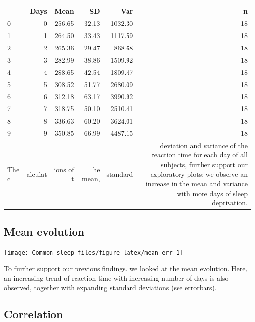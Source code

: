 \documentclass[
]{article}
\begin{document}
\begin{longtable}[]{@{}lrrrrr@{}}
\toprule
& Days & Mean & SD & Var & n\tabularnewline
\midrule
\endhead
0 & 0 & 256.65 & 32.13 & 1032.30 & 18\tabularnewline
1 & 1 & 264.50 & 33.43 & 1117.59 & 18\tabularnewline
2 & 2 & 265.36 & 29.47 & 868.68 & 18\tabularnewline
3 & 3 & 282.99 & 38.86 & 1509.92 & 18\tabularnewline
4 & 4 & 288.65 & 42.54 & 1809.47 & 18\tabularnewline
5 & 5 & 308.52 & 51.77 & 2680.09 & 18\tabularnewline
6 & 6 & 312.18 & 63.17 & 3990.92 & 18\tabularnewline
7 & 7 & 318.75 & 50.10 & 2510.41 & 18\tabularnewline
8 & 8 & 336.63 & 60.20 & 3624.01 & 18\tabularnewline
9 & 9 & 350.85 & 66.99 & 4487.15 & 18\tabularnewline
The c & alculat & ions of t & he mean, & standard & deviation and
variance of the reaction time for each day of all subjects, further
support our exploratory plots: we observe an increase in the mean and
variance with more days of sleep deprivation.\tabularnewline
\bottomrule
\end{longtable}

\hypertarget{mean-evolution}{%
\subsection{Mean evolution}\label{mean-evolution}}

\begin{center}\texttt{[image: Common\_sleep\_files/figure-latex/mean\_err-1]} \end{center}

To further support our previous findings, we looked at the mean
evolution. Here, an increasing trend of reaction time with increasing
number of days is also observed, together with expanding standard
deviations (see errorbars).

\hypertarget{correlation}{%
\subsection{Correlation}\label{correlation}}
\end{document}

